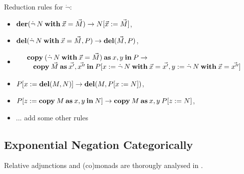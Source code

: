 \documentclass[8pt]{article}
\theoremstyle{definition}
\theoremstyle{definition}
\theoremstyle{definition}
\theoremstyle{definition}
\theoremstyle{definition}
\theoremstyle{definition}
\theoremstyle{definition}
\theoremstyle{definition}
\theoremstyle{definition}
\theoremstyle{definition}
\theoremstyle{definition}
\theoremstyle{definition}
\theoremstyle{definition}
\theoremstyle{definition}
\theoremstyle{question}
\begin{document}
Reduction rules for $\dot{\neg}$:
\begin{itemize}
  \item[$(\dot{\neg}_{\beta})$] ${\bf der}(\dot{\neg} \: N \: {\bf with} \: \vec{x} = \vec{M}) \to N [\vec{x} := \vec{M}]$,
  \item[$({\bf del}_{\beta})$] ${\bf del}(\dot{\neg} \: N \: {\bf with} \: \vec{x} = \vec{M}, P) \to {\bf del}(\vec{M}, P)$,
  \item[$({\bf copy}_{\beta})$] 
  $\begin{array}{lll}
    & {\bf copy} \: (\dot{\neg} \: N \: {\bf with} \: \vec{x} = \vec{M}) \: {\bf as} \: x, y \: {\bf in} \: P \to & \\
    & \:\:\:\: {\bf copy} \: \vec{M} \: {\bf as} \: \vec{x'},\vec{x''} \: {\bf in} \: P[x:= \dot{\neg} \: N \: {\bf with} \: \vec{x} = \vec{x'}, y:= \dot{\neg} \: N \: {\bf with} \: \vec{x} = \vec{x''}]&
  \end{array}$
  \item[$({\bf del}_{nat})$] $P[x := {\bf del}(M,N)] \to {\bf del}(M, P[x:=N])$,
  \item[$({\bf copy}_{nat})$] $P[z := {\bf copy} \: M \: {\bf as} \: x,y \: {\bf in} \: N] \to {\bf copy} \: M \: {\bf as} \: x,y \: P[z:=N]$,
  \item... add some other rules
\end{itemize}

\subsection{Exponential Negation Categorically}

Relative adjunctions and (co)monads are thorougly analysed in \cite{altenkirch2015monads}.
\end{document}
